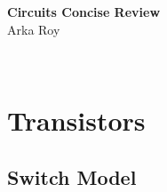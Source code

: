 \documentclass[11pt,fleqn]{article}
\theoremstyle{definition}
\begin{document}
\begin{center}
{\huge \textbf{Circuits Concise Review}}\\
Arka Roy
\end{center}
\\

\tableofcontents

\newpage



\section{Transistors}

\subsection{Switch Model}  
\end{document}
